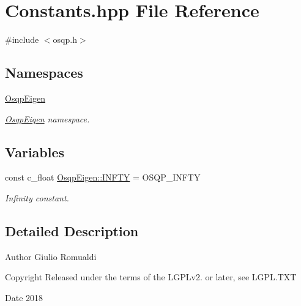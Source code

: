 \section{Constants.\+hpp File Reference}
\label{Constants_8hpp}
{\ttfamily \#include $<$osqp.\+h$>$}\newline
\subsection*{Namespaces}
\begin{DoxyCompactItemize}
\item 
 \mbox{\hyperlink{namespaceOsqpEigen}{Osqp\+Eigen}}
\begin{DoxyCompactList}\small\item\em \mbox{\hyperlink{namespaceOsqpEigen}{Osqp\+Eigen}} namespace. \end{DoxyCompactList}\end{DoxyCompactItemize}
\subsection*{Variables}
\begin{DoxyCompactItemize}
\item 
const c\+\_\+float \mbox{\hyperlink{namespaceOsqpEigen_acfe9d2ea05e99677c0dc9e8f5646098d}{Osqp\+Eigen\+::\+I\+N\+F\+TY}} = O\+S\+Q\+P\+\_\+\+I\+N\+F\+TY
\begin{DoxyCompactList}\small\item\em Infinity constant. \end{DoxyCompactList}\end{DoxyCompactItemize}


\subsection{Detailed Description}
\begin{DoxyAuthor}{Author}
Giulio Romualdi 
\end{DoxyAuthor}
\begin{DoxyCopyright}{Copyright}
Released under the terms of the L\+G\+P\+Lv2. or later, see L\+G\+P\+L.\+T\+XT 
\end{DoxyCopyright}
\begin{DoxyDate}{Date}
2018 
\end{DoxyDate}
